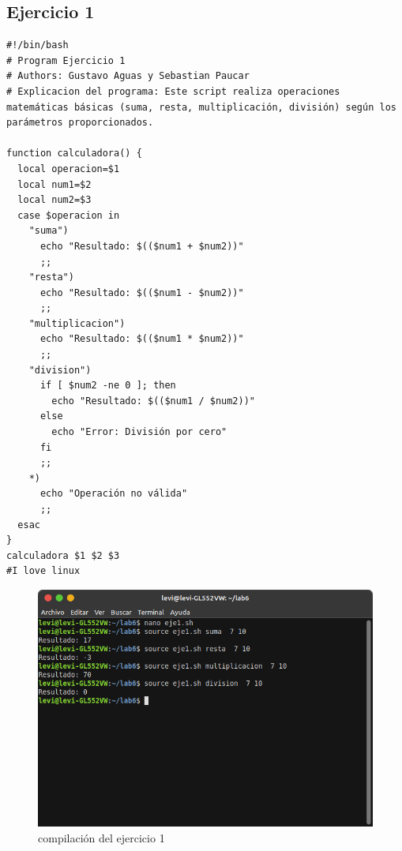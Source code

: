 \documentclass[11pt,twoside]{book}
\begin{document}
\subsection{Ejercicio 1}
\begin{lstlisting}
#!/bin/bash
# Program Ejercicio 1
# Authors: Gustavo Aguas y Sebastian Paucar
# Explicacion del programa: Este script realiza operaciones matemáticas básicas (suma, resta, multiplicación, división) según los parámetros proporcionados.

function calculadora() {
  local operacion=$1
  local num1=$2
  local num2=$3
  case $operacion in
    "suma")
      echo "Resultado: $(($num1 + $num2))"
      ;;
    "resta")
      echo "Resultado: $(($num1 - $num2))"
      ;;
    "multiplicacion")
      echo "Resultado: $(($num1 * $num2))"
      ;;
    "division")
      if [ $num2 -ne 0 ]; then
        echo "Resultado: $(($num1 / $num2))"
      else
        echo "Error: División por cero"
      fi
      ;;
    *)
      echo "Operación no válida"
      ;;
  esac
}
calculadora $1 $2 $3
#I love linux
\end{lstlisting}
\begin{figure}[h]
    \centering
    \includegraphics[width=0.8\linewidth]{img_tarea6/eje1con.png}
    \caption{ compilación del ejercicio 1}
\end{figure}

\newpage
\end{document}
